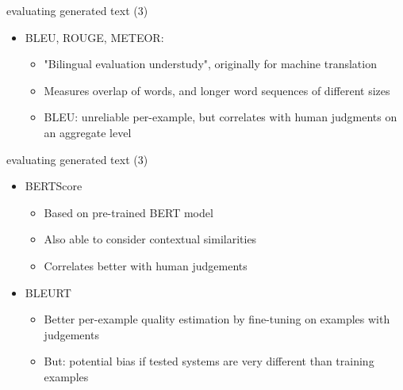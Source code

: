 
\begin{vbframe}{evaluating generated text (3)}

\vfill

\begin{itemize}
	\item BLEU, ROUGE, METEOR:
			\begin{itemize}
				\item "Bilingual evaluation understudy", originally for machine translation
				\item Measures overlap of words, and longer word sequences of different sizes
				\item BLEU: unreliable per-example, but correlates with human judgments on an aggregate level 
			\end{itemize}
\end{itemize}

\vfill

\end{vbframe}


\begin{vbframe}{evaluating generated text (3)}

\vfill

\begin{itemize}
	\item BERTScore
			\begin{itemize}
				\item Based on pre-trained BERT model
				\item Also able to consider contextual similarities
				\item Correlates better with human judgements
			\end{itemize}
	\item BLEURT
			\begin{itemize}
				\item Better per-example quality estimation by fine-tuning on examples with judgements
				\item But: potential bias if tested systems are very different than training examples
			\end{itemize}
\end{itemize}

\vfill

\end{vbframe}

